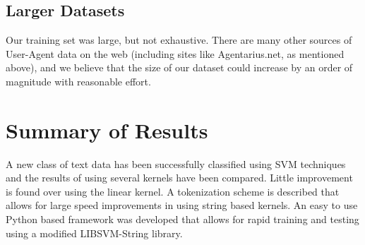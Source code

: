 \documentclass[10pt]{article}
\begin{document}
\begin{multicols}{2}
\subsection{Larger Datasets}
Our training set was large, but not exhaustive. There are many other sources of User-Agent data on the web (including sites like Agentarius.net, as mentioned above), and we believe that the size of our dataset could increase by an order of magnitude with reasonable effort.

\section{Summary of Results}
A new class of text data has been successfully classified using SVM techniques and the results of using several kernels have been compared.  Little improvement is found over using the linear kernel.  A tokenization scheme is described that allows for large speed improvements in using string based kernels.  An easy to use Python based framework was developed that allows for rapid training and testing using a modified LIBSVM-String library.  

\end{multicols}




\end{document}
